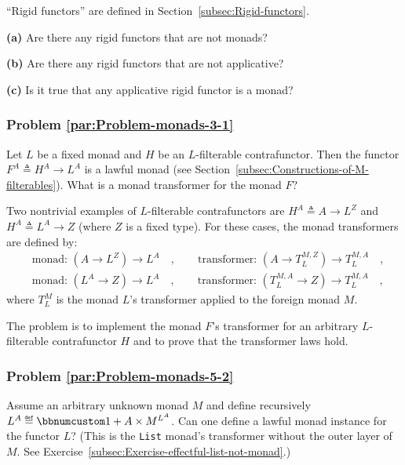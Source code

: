 \textsf{``}Rigid functors\textsf{''} are defined
in Section~\ref{subsec:Rigid-functors}.

\textbf{(a)} Are there any rigid functors that are not monads? 

\textbf{(b)} Are there any rigid functors that are not applicative?

\textbf{(c)} Is it true that any applicative rigid functor is a monad?

\subsubsection{Problem \label{par:Problem-monads-3-1}\ref{par:Problem-monads-3-1}}

Let $L$ be a fixed monad and $H$ be an $L$-filterable contrafunctor.
Then the functor $F^{A}\triangleq H^{A}\rightarrow L^{A}$ is a lawful
monad (see Section~\ref{subsec:Constructions-of-M-filterables}).
What is a monad transformer for the monad $F$? 

Two nontrivial examples of $L$-filterable contrafunctors are $H^{A}\triangleq A\rightarrow L^{Z}$
and $H^{A}\triangleq L^{A}\rightarrow Z$ (where $Z$ is a fixed type).
For these cases, the monad transformers are defined by:
\begin{align*}
 & \text{monad: }(A\rightarrow L^{Z})\rightarrow L^{A}\quad,\quad\quad\text{transformer: }(A\rightarrow T_{L}^{M,Z})\rightarrow T_{L}^{M,A}\quad,\\
 & \text{monad: }(L^{A}\rightarrow Z)\rightarrow L^{A}\quad,\quad\quad\text{transformer: }(T_{L}^{M,A}\rightarrow Z)\rightarrow T_{L}^{M,A}\quad,
\end{align*}
where $T_{L}^{M}$ is the monad $L$\textsf{'}s transformer applied to the
foreign monad $M$.

The problem is to implement the monad $F$\textsf{'}s transformer for an arbitrary
$L$-filterable contrafunctor $H$ and to prove that the transformer
laws hold.

\subsubsection{Problem \label{par:Problem-monads-5-2}\ref{par:Problem-monads-5-2}}

Assume an arbitrary unknown monad $M$ and define recursively $L^{A}\triangleq\bbnum 1+A\times M^{L^{A}}$.
Can one define a lawful monad instance for the functor $L$? (This
is the \lstinline!List! monad\textsf{'}s transformer without the outer layer
of $M$. See Exercise~\ref{subsec:Exercise-effectful-list-not-monad}.)

